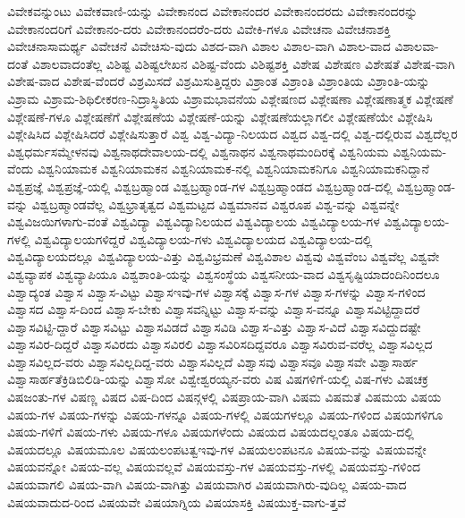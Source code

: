 {ವಿವೇಕವನ್ನುಂಟು
ವಿವೇಕವಾಣಿ-ಯನ್ನು
ವಿವೇಕಾನಂದ
ವಿವೇಕಾನಂದರ
ವಿವೇಕಾನಂದರದು
ವಿವೇಕಾನಂದರನ್ನು
ವಿವೇಕಾನಂದರಿಗೆ
ವಿವೇಕಾನಂ-ದರು
ವಿವೇಕಾನಂದರೆಂ-ದರು
ವಿವೇಕಿ-ಗಳೂ
ವಿವೇಚನಾ
ವಿವೇಚನಾಶಕ್ತಿ
ವಿವೇಚನಾಸಾಮರ್ಥ್ಯ
ವಿವೇಚನೆ
ವಿವೇಚಿಸು-ವುದು
ವಿಶದ-ವಾಗಿ
ವಿಶಾಲ
ವಿಶಾಲ-ವಾಗಿ
ವಿಶಾಲ-ವಾದ
ವಿಶಾಲವಾ-ದಂತೆ
ವಿಶಾಲವಾದಂತೆಲ್ಲ
ವಿಶಿಷ್ಟ
ವಿಶಿಷ್ಟಲೇಖನ
ವಿಶಿಷ್ಟ-ವೆಂದು
ವಿಶಿಷ್ಟಶಕ್ತಿ
ವಿಶೇಷ
ವಿಶೇಷಣ
ವಿಶೇಷತೆ
ವಿಶೇಷ-ವಾಗಿ
ವಿಶೇಷ-ವಾದ
ವಿಶೇಷ-ವೆಂದರೆ
ವಿಶ್ರಮಿಸದೆ
ವಿಶ್ರಮಿಸುತ್ತಿದ್ದರು
ವಿಶ್ರಾಂತ
ವಿಶ್ರಾಂತಿ
ವಿಶ್ರಾಂತಿಯ
ವಿಶ್ರಾಂತಿ-ಯನ್ನು
ವಿಶ್ರಾಮ
ವಿಶ್ರಾಮ-ಶಿಥಿಲೀಕರಣ-ನಿದ್ರಾಸ್ಥಿತಿಯ
ವಿಶ್ರಾಮಭಾವನೆಯ
ವಿಶ್ಲೇಷಣದ
ವಿಶ್ಲೇಷಣಾ
ವಿಶ್ಲೇಷಣಾತ್ಮಕ
ವಿಶ್ಲೇಷಣೆ
ವಿಶ್ಲೇಷಣೆ-ಗಳೂ
ವಿಶ್ಲೇಷಣೆಗೆ
ವಿಶ್ಲೇಷಣೆಯ
ವಿಶ್ಲೇಷಣೆ-ಯನ್ನು
ವಿಶ್ಲೇಷಣೆಯಲ್ಲಾಗಲೀ
ವಿಶ್ಲೇಷಣೆಯೇ
ವಿಶ್ಲೇಷಿಸಿ
ವಿಶ್ಲೇಷಿಸಿದ
ವಿಶ್ಲೇಷಿಸಿದರೆ
ವಿಶ್ಲೇಷಿಸುತ್ತಾರೆ
ವಿಶ್ವ
ವಿಶ್ವ-ವಿದ್ಯಾ-ನಿಲಯದ
ವಿಶ್ವದ
ವಿಶ್ವ-ದಲ್ಲಿ
ವಿಶ್ವ-ದಲ್ಲಿರುವ
ವಿಶ್ವದೆಲ್ಲರ
ವಿಶ್ವಧರ್ಮಸಮ್ಮೇಳನವು
ವಿಶ್ವನಾಥದೇವಾಲಯ-ದಲ್ಲಿ
ವಿಶ್ವನಾಥನ
ವಿಶ್ವನಾಥಮಂದಿರಕ್ಕೆ
ವಿಶ್ವನಿಯಮ
ವಿಶ್ವನಿಯಮ-ವೆಂದು
ವಿಶ್ವನಿಯಾಮಕ
ವಿಶ್ವನಿಯಾಮಕನ
ವಿಶ್ವನಿಯಾಮಕ-ನಲ್ಲಿ
ವಿಶ್ವನಿಯಾಮಕನಿಗೂ
ವಿಶ್ವನಿಯಾಮಕನಿದ್ದಾನೆ
ವಿಶ್ವಪ್ರಜ್ಞೆ
ವಿಶ್ವಪ್ರಜ್ಞೆ-ಯಲ್ಲಿ
ವಿಶ್ವಬ್ರಹ್ಮಾಂಡ
ವಿಶ್ವಬ್ರಹ್ಮಾಂಡ-ಗಳ
ವಿಶ್ವಬ್ರಹ್ಮಾಂಡದ
ವಿಶ್ವಬ್ರಹ್ಮಾಂಡ-ದಲ್ಲಿ
ವಿಶ್ವಬ್ರಹ್ಮಾಂಡ-ವನ್ನು
ವಿಶ್ವಬ್ರಹ್ಮಾಂಡವೆಲ್ಲ
ವಿಶ್ವಭ್ರಾತೃತ್ವದ
ವಿಶ್ವಮಟ್ಟದ
ವಿಶ್ವಮಾನವ
ವಿಶ್ವರೂಪ
ವಿಶ್ವ-ವನ್ನು
ವಿಶ್ವವನ್ನೇ
ವಿಶ್ವವಿಜಯಿಗಳಾಗು-ವಂತೆ
ವಿಶ್ವವಿದ್ಯಾ
ವಿಶ್ವವಿದ್ಯಾನಿಲಯದ
ವಿಶ್ವವಿದ್ಯಾಲಯ
ವಿಶ್ವವಿದ್ಯಾಲಯ-ಗಳ
ವಿಶ್ವವಿದ್ಯಾಲಯ-ಗಳಲ್ಲಿ
ವಿಶ್ವವಿದ್ಯಾಲಯಗಳಿದ್ದರೆ
ವಿಶ್ವವಿದ್ಯಾಲಯ-ಗಳು
ವಿಶ್ವವಿದ್ಯಾಲಯದ
ವಿಶ್ವವಿದ್ಯಾಲಯ-ದಲ್ಲಿ
ವಿಶ್ವವಿದ್ಯಾಲಯದಲ್ಲೂ
ವಿಶ್ವವಿದ್ಯಾಲಯ-ವಿತ್ತು
ವಿಶ್ವವಿಭ್ರಮಣೆ
ವಿಶ್ವವಿಶಾಲ
ವಿಶ್ವವು
ವಿಶ್ವವೆಂಬ
ವಿಶ್ವವೆಲ್ಲ
ವಿಶ್ವವೇ
ವಿಶ್ವವ್ಯಾಪಕ
ವಿಶ್ವವ್ಯಾಪಿಯೂ
ವಿಶ್ವಶಾಂತಿ-ಯನ್ನು
ವಿಶ್ವಸಂಸ್ಥೆಯ
ವಿಶ್ವಸನೀಯ-ವಾದ
ವಿಶ್ವಸೃಷ್ಟಿಯಾದಂದಿನಿಂದಲೂ
ವಿಶ್ವಾದ್ಯಂತ
ವಿಶ್ವಾಸ
ವಿಶ್ವಾಸ-ವಿಟ್ಟು
ವಿಶ್ವಾಸಇವು-ಗಳ
ವಿಶ್ವಾಸಕ್ಕೆ
ವಿಶ್ವಾಸ-ಗಳ
ವಿಶ್ವಾಸ-ಗಳನ್ನು
ವಿಶ್ವಾಸ-ಗಳಿಂದ
ವಿಶ್ವಾಸದ
ವಿಶ್ವಾಸ-ದಿಂದ
ವಿಶ್ವಾಸ-ಬೇಕು
ವಿಶ್ವಾಸವನ್ನಿಟ್ಟು
ವಿಶ್ವಾಸ-ವನ್ನು
ವಿಶ್ವಾಸ-ವನ್ನೂ
ವಿಶ್ವಾಸವಿಟ್ಟಿದ್ದಾದರೆ
ವಿಶ್ವಾಸವಿಟ್ಟಿ-ದ್ದಾರೆ
ವಿಶ್ವಾಸವಿಟ್ಟು
ವಿಶ್ವಾಸವಿಡದೆ
ವಿಶ್ವಾಸವಿಡಿ
ವಿಶ್ವಾಸ-ವಿತ್ತು
ವಿಶ್ವಾಸ-ವಿದೆ
ವಿಶ್ವಾಸವಿದ್ದುದಷ್ಟೇ
ವಿಶ್ವಾಸವಿರ-ದಿದ್ದರೆ
ವಿಶ್ವಾಸವಿರದು
ವಿಶ್ವಾಸವಿರಲಿ
ವಿಶ್ವಾಸವಿರಿಸದಿದ್ದವರೂ
ವಿಶ್ವಾಸವಿರುವ-ವರೆಲ್ಲ
ವಿಶ್ವಾಸವಿಲ್ಲದ
ವಿಶ್ವಾಸವಿಲ್ಲದ-ವರು
ವಿಶ್ವಾಸವಿಲ್ಲದಿದ್ದ-ವರು
ವಿಶ್ವಾಸವಿಲ್ಲದೆ
ವಿಶ್ವಾಸವು
ವಿಶ್ವಾಸವೂ
ವಿಶ್ವಾಸವೇ
ವಿಶ್ವಾಸಾರ್ಹ
ವಿಶ್ವಾಸಾರ್ಹತೆಕ್ರಿಡಿಬಿಲಿಡಿ-ಯನ್ನು
ವಿಶ್ವಾಸೋ
ವಿಶ್ವೇಶ್ವರಯ್ಯನ-ವರು
ವಿಷ
ವಿಷಗಳಿಗೆ-ಯಲ್ಲಿ
ವಿಷ-ಗಳು
ವಿಷಚಕ್ರ
ವಿಷಜಂತು-ಗಳ
ವಿಷಣ್ಣ
ವಿಷದ
ವಿಷ-ದಿಂದ
ವಿಷನ್ಗಳಲ್ಲಿ
ವಿಷಪ್ರಾಯ-ವಾಗಿ
ವಿಷಮ
ವಿಷಮತೆ
ವಿಷಮಯ
ವಿಷಯ
ವಿಷಯ-ಗಳ
ವಿಷಯ-ಗಳನ್ನು
ವಿಷಯ-ಗಳನ್ನೂ
ವಿಷಯ-ಗಳಲ್ಲಿ
ವಿಷಯಗಳಲ್ಲೂ
ವಿಷಯ-ಗಳಿಂದ
ವಿಷಯಗಳಿಗೂ
ವಿಷಯ-ಗಳಿಗೆ
ವಿಷಯ-ಗಳು
ವಿಷಯ-ಗಳೂ
ವಿಷಯಗಳೆಂದು
ವಿಷಯದ
ವಿಷಯದಲ್ಲಂತೂ
ವಿಷಯ-ದಲ್ಲಿ
ವಿಷಯದಲ್ಲೂ
ವಿಷಯಮೂಲ
ವಿಷಯಲಂಪಟತ್ವಇವು-ಗಳ
ವಿಷಯಲಂಪಟನೂ
ವಿಷಯ-ವನ್ನು
ವಿಷಯವನ್ನೇ
ವಿಷಯವನ್ನೋ
ವಿಷಯ-ವಲ್ಲ
ವಿಷಯವಲ್ಲವೆ
ವಿಷಯವಸ್ತು-ಗಳ
ವಿಷಯವಸ್ತು-ಗಳಲ್ಲಿ
ವಿಷಯವಸ್ತು-ಗಳಿಂದ
ವಿಷಯವಾಗಲಿ
ವಿಷಯ-ವಾಗಿ
ವಿಷಯ-ವಾಗಿತ್ತು
ವಿಷಯವಾಗಿರ
ವಿಷಯವಾಗಿರು-ವುದಿಲ್ಲ
ವಿಷಯ-ವಾದ
ವಿಷಯವಾದುದ-ರಿಂದ
ವಿಷಯವೇ
ವಿಷಯಾಗ್ನಿಯ
ವಿಷಯಾಸಕ್ತಿ
ವಿಷಯುಕ್ತ-ವಾಗು-ತ್ತವೆ
}
